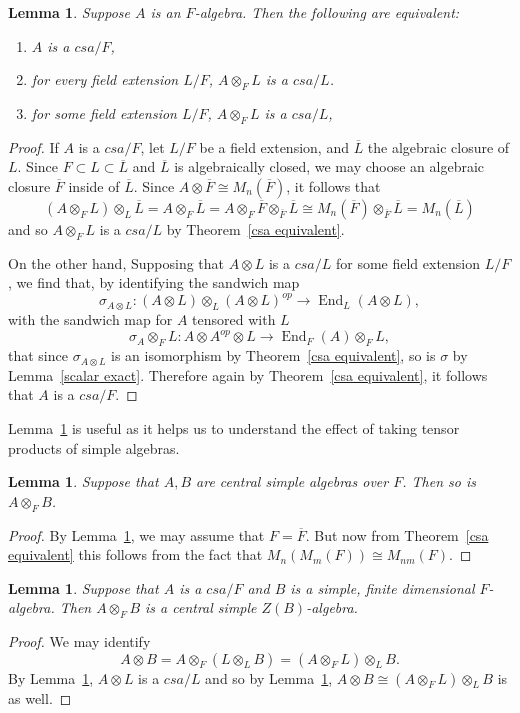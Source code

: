 \documentclass[12pt]{report}
\theoremstyle{plain}
\newtheorem{lem}[thm]{Lemma}
\newcommand{\oper}[1]{\operatorname{#1}}
\newcommand{\ov}{\overline}
\newcommand{\End}{\oper{End}}
\begin{document}
\begin{lem} \label{csa scalar extension}
Suppose $A$ is an $F$-algebra. Then the following are equivalent:
\begin{enumerate}[1. ]
\item $A$ is a $csa/F$,
\item for every field extension $L/F$, $A \otimes_F L$ is a $csa/L$.
\item for some field extension $L/F$, $A \otimes_F L$ is a $csa/L$,
\end{enumerate}
\end{lem}
\begin{proof}
If $A$ is a $csa/F$, let $L/F$ be a field extension, and $\ov L$ the
algebraic closure of $L$. Since $F \subset L \subset \ov L$ and $\ov L$ is
algebraically closed, we may choose an algebraic closure $\ov F$ inside of
$\ov L$. Since $A \otimes \ov F  \cong M_n(\ov F)$, it follows that 
\[(A \otimes_F L) \otimes_L \ov L  = A \otimes_F \ov L = A \otimes_F \ov F
\otimes_{\ov F} \ov L  \cong M_n(\ov F) \otimes_{\ov F} \ov L = M_n(\ov
L)\]
and so $A \otimes_F L$ is a $csa/L$ by Theorem~\ref{csa equivalent}.

On the other hand, Supposing that $A \otimes L$ is a $csa/L$ for some field
extension $L/F$, we find that, by identifying the sandwich map
\[\sigma_{A \otimes L} : (A \otimes L) \otimes_L (A \otimes L)^{op} \to
\End_L(A \otimes L),\]
with the sandwich map for $A$ tensored with $L$
\[\sigma_A \otimes_F L: A \otimes A^{op} \otimes L \to \End_F(A) \otimes_F
L,\]
that since $\sigma_{A \otimes L}$ is an isomorphism by Theorem~\ref{csa
equivalent}, so is $\sigma$ by Lemma~\ref{scalar exact}. Therefore again by
Theorem~\ref{csa equivalent}, it follows that $A$ is a $csa/F$.
\end{proof}

Lemma~\ref{csa scalar extension} is useful as it helps us to understand
the effect of taking tensor products of simple algebras.

\begin{lem} \label{csa tensors}
Suppose that $A, B$ are central simple algebras over $F$. Then so is $A
\otimes_F B$.
\end{lem}
\begin{proof}
By Lemma~\ref{csa scalar extension}, we may assume that $F = \ov F$. But
now from Theorem~\ref{csa equivalent} this follows from the fact that
$M_n(M_m(F)) \cong M_{nm}(F)$.
\end{proof}

\begin{lem} \label{simple tensors}
Suppose that $A$ is a $csa/F$ and $B$ is a simple, finite dimensional
$F$-algebra. Then $A \otimes_F B$ is a central simple $Z(B)$-algebra.
\end{lem}
\begin{proof}
We may identify
\[A \otimes B = A \otimes_F (L \otimes_L B) = (A \otimes_F L) \otimes_L B. \]
By Lemma~\ref{csa scalar extension}, $A \otimes L$ is a $csa/L$ and so by
Lemma~\ref{csa tensors}, $A \otimes B \cong (A \otimes_F L) \otimes_L B$ is
as well.
\end{proof}
\end{document}
